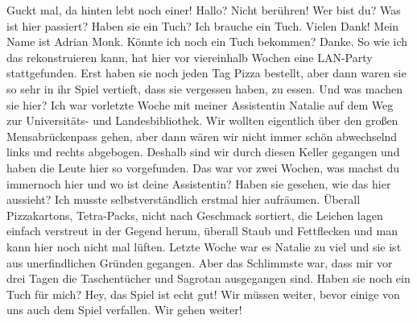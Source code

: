 \begin{verseplay}[10em]
\s{\Legolars}  Guckt mal, da hinten lebt noch einer!
\s{\Gandalf}  Hallo?
\s{\Monk}  Nicht berühren! 
\s{\Gandalf} Wer bist du? Was ist hier passiert?
\s{\Monk} Haben sie ein Tuch? Ich brauche ein Tuch.
\s{\Gandalf} 
\s{\Legolars} 
\s{\Monk} Vielen Dank! 
\s{\Monk} Mein Name ist Adrian Monk. Könnte ich noch ein Tuch bekommen?
\s{\Legolars} 
\s{\Monk}  Danke. So wie ich das rekonstruieren kann, hat hier vor viereinhalb Wochen eine LAN-Party stattgefunden. Erst haben sie noch jeden Tag Pizza bestellt, aber dann waren sie so sehr in ihr Spiel vertieft, dass sie vergessen haben, zu essen.
\s{\Gimli} 
\s{\Legolars} Und was machen sie hier?
\s{\Monk} Ich war vorletzte Woche mit meiner Assistentin Natalie auf dem Weg zur Universitäts- und Landesbibliothek. Wir wollten eigentlich über den großen Mensabrückenpass gehen, aber dann wären wir nicht immer schön abwechselnd links und rechts abgebogen. Deshalb sind wir durch diesen Keller gegangen und haben die Leute hier so vorgefunden.
\s{\Gandalf} Das war vor zwei Wochen, was machst du immernoch hier und wo ist deine Assistentin?
\s{\Monk} Haben sie gesehen, wie das hier aussieht? Ich musste selbstverständlich erstmal hier aufräumen. Überall Pizzakartons, Tetra-Packs, nicht nach Geschmack sortiert, die Leichen lagen einfach verstreut in der Gegend herum, überall Staub und Fettflecken und man kann hier noch nicht mal lüften. Letzte Woche war es Natalie zu viel und sie ist aus unerfindlichen Gründen gegangen. Aber das Schlimmste war, dass mir vor drei Tagen die Taschentücher und Sagrotan ausgegangen sind.  Haben sie noch ein Tuch für mich?
\s{\Legolars} 
\s{\Monk} 
\s{\Sum} Hey, das Spiel ist echt gut!
\s{\Gandalf}  Wir müssen weiter, bevor einige von uns  auch dem Spiel verfallen.
\s{\Gimli} 
\s{\Gandalf}  Wir gehen weiter!
\s{\Sum} 
\end{verseplay}

